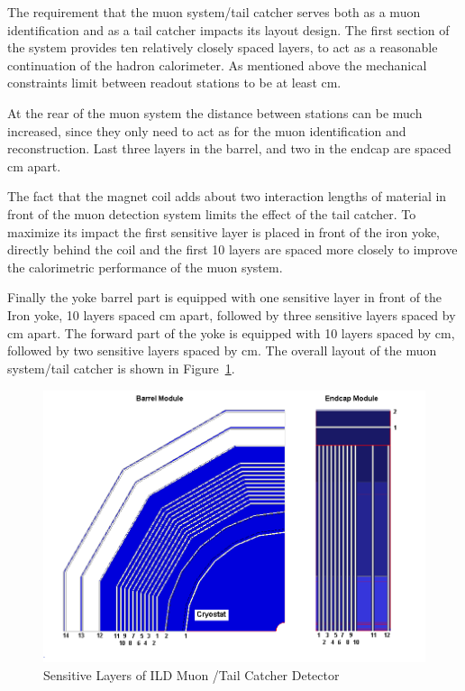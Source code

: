 The requirement that the muon system/tail catcher serves both as a muon identification and as a tail catcher impacts its layout design.
The first section of the system provides ten relatively closely spaced layers, to act as a reasonable continuation of the hadron calorimeter.
As mentioned above the mechanical constraints limit between readout stations to be at least \unit[10]{cm}.

At the rear of the muon system the distance between stations can be much increased, since they only need to act as for the  muon identification and reconstruction.
Last three layers in the barrel, and two in the endcap are spaced \unit[60]{cm} apart.

The fact that the magnet coil adds about two interaction lengths of material in front of the muon detection system limits the effect of the tail catcher.
To maximize its impact the first sensitive layer is placed in front of the iron yoke, directly behind the coil and the first 10 layers are spaced more closely
to improve the calorimetric performance of the muon system.

Finally the yoke barrel part is equipped with one sensitive layer in front of the Iron yoke, 10 layers spaced \unit[14]{cm} apart, followed by three sensitive layers spaced by \unit[60]{cm} apart. The forward part of the yoke is equipped with 10 layers spaced by \unit[14]{cm}, followed by two sensitive layers spaced by \unit[60]{cm}. The overall layout of the muon system/tail catcher is shown in Figure~\ref{fig:ild:muon:concept}.

\begin{figure}
	\centering
\includegraphics[height=8cm]{MuonDetector/MuonDetectorILD/2D_barel_endcap.png}
	\caption{Sensitive Layers of ILD Muon /Tail Catcher Detector}
	\label{fig:ild:muon:concept}
\end{figure}

